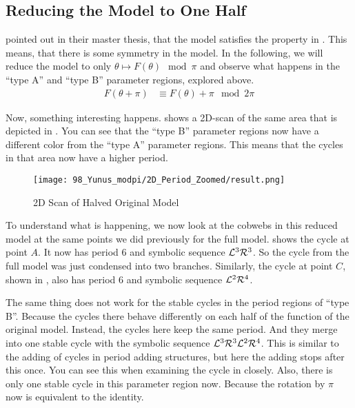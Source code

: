 \subsection{Reducing the Model to One Half}
\label{sec:og.halved}

 pointed out in their master thesis, that the model satisfies the property in .
This means, that there is some symmetry in the model.
In the following, we will reduce the model to only $\theta \mapsto F(\theta) \mod \pi$ and observe what happens in the ``type A'' and ``type B'' parameter regions, explored above.
\begin{align}
	F(\theta + \pi) & \equiv F(\theta) + \pi \mod 2 \pi \label{equ:yunus.property.symmetry}
\end{align}

Now, something interesting happens.
 shows a 2D-scan of the same area that is depicted in .
You can see that the ``type B'' parameter regions now have a different color from the ``type A'' parameter regions.
This means that the cycles in that area now have a higher period.

\begin{figure}
	\centering
	\texttt{[image: 98\_Yunus\_modpi/2D\_Period\_Zoomed/result.png]}
	\caption{2D Scan of Halved Original Model}
	\label{fig:yunus.pi.2d.full}
\end{figure}

To understand what is happening, we now look at the cobwebs in this reduced model at the same points we did previously for the full model.
 shows the cycle at point $A$.
It now has period 6 and symbolic sequence $\mathcal{L}^3\mathcal{R}^3$.
So the cycle from the full model was just condensed into two branches.
Similarly, the cycle at point $C$, shown in , also has period 6 and symbolic sequence $\mathcal{L}^2\mathcal{R}^4$.

The same thing does not work for the stable cycles in the period regions of ``type B''.
Because the cycles there behave differently on each half of the function of the original model.
Instead, the cycles here keep the same period.
And they merge into one stable cycle with the symbolic sequence $\mathcal{L}^3\mathcal{R}^3\mathcal{L}^2\mathcal{R}^4$.
This is similar to the adding of cycles in period adding structures, but here the adding stops after this once.
You can see this when examining the cycle in  closely.
Also, there is only one stable cycle in this parameter region now.
Because the rotation by $\pi$ now is equivalent to the identity.

